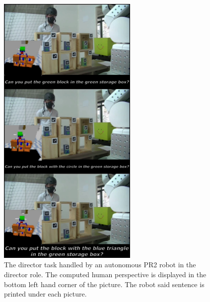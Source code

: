 \documentclass[a4paper,11pt,twoside]{StyleThese}
\begin{document}
\begin{figure}[hbtp]
\centering
\includegraphics[width=0.6\textwidth]{figures/chapter5/dt_demo.png}
\caption{The director task handled by an autonomous PR2 robot in the director role. The computed human perspective is displayed in the bottom left hand corner of the picture. The robot said sentence is printed under each picture.}
\label{fig:chap5dtdemodirector}
\end{figure}
\end{document}
